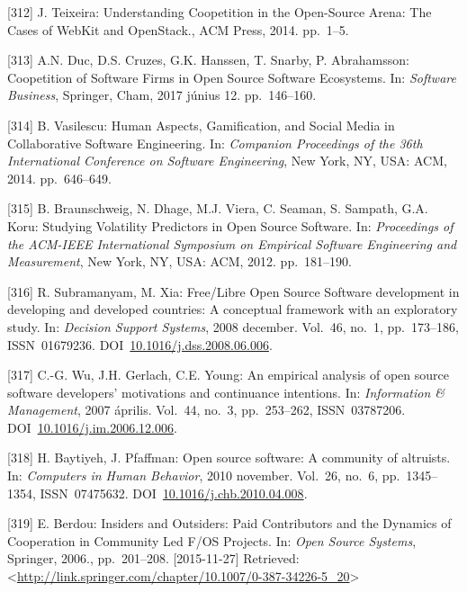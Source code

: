 \documentclass[12pt,magyar,a4paper,oneside]{scrreprt}
\begin{document}
\leavevmode\hypertarget{ref-teixeira_understanding_2014}{}%
{[}312{]} J. Teixeira: Understanding Coopetition in the Open-Source
Arena: The Cases of WebKit and OpenStack., ACM Press, 2014. pp.~1--5.

\leavevmode\hypertarget{ref-duc_coopetition_2017}{}%
{[}313{]} A.N. Duc, D.S. Cruzes, G.K. Hanssen, T. Snarby, P.
Abrahamsson: Coopetition of Software Firms in Open Source Software
Ecosystems. In: \emph{Software Business}, Springer, Cham, 2017 június
12. pp.~146--160.

\leavevmode\hypertarget{ref-vasilescu_human_2014}{}%
{[}314{]} B. Vasilescu: Human Aspects, Gamification, and Social Media in
Collaborative Software Engineering. In: \emph{Companion Proceedings of
the 36th International Conference on Software Engineering}, New York,
NY, USA: ACM, 2014. pp.~646--649.

\leavevmode\hypertarget{ref-braunschweig_studying_2012}{}%
{[}315{]} B. Braunschweig, N. Dhage, M.J. Viera, C. Seaman, S. Sampath,
G.A. Koru: Studying Volatility Predictors in Open Source Software. In:
\emph{Proceedings of the ACM-IEEE International Symposium on Empirical
Software Engineering and Measurement}, New York, NY, USA: ACM, 2012.
pp.~181--190.

\leavevmode\hypertarget{ref-subramanyam_freeux2flibre_2008}{}%
{[}316{]} R. Subramanyam, M. Xia: Free/Libre Open Source Software
development in developing and developed countries: A conceptual
framework with an exploratory study. In: \emph{Decision Support
Systems}, 2008 december. Vol.~46, no.~1, pp.~173--186, ISSN~01679236.
DOI~\href{https://doi.org/10.1016/j.dss.2008.06.006}{10.1016/j.dss.2008.06.006}.

\leavevmode\hypertarget{ref-wu_empirical_2007}{}%
{[}317{]} C.-G. Wu, J.H. Gerlach, C.E. Young: An empirical analysis of
open source software developers' motivations and continuance intentions.
In: \emph{Information \& Management}, 2007 április. Vol.~44, no.~3,
pp.~253--262, ISSN~03787206.
DOI~\href{https://doi.org/10.1016/j.im.2006.12.006}{10.1016/j.im.2006.12.006}.

\leavevmode\hypertarget{ref-baytiyeh_open_2010}{}%
{[}318{]} H. Baytiyeh, J. Pfaffman: Open source software: A community of
altruists. In: \emph{Computers in Human Behavior}, 2010 november.
Vol.~26, no.~6, pp.~1345--1354, ISSN~07475632.
DOI~\href{https://doi.org/10.1016/j.chb.2010.04.008}{10.1016/j.chb.2010.04.008}.

\leavevmode\hypertarget{ref-berdou_insiders_2006}{}%
{[}319{]} E. Berdou: Insiders and Outsiders: Paid Contributors and the
Dynamics of Cooperation in Community Led F/OS Projects. In: \emph{Open
Source Systems}, Springer, 2006., pp.~201--208. {[}2015-11-27{]}
Retrieved:
\textless{}\url{http://link.springer.com/chapter/10.1007/0-387-34226-5_20}\textgreater{}
\end{document}
